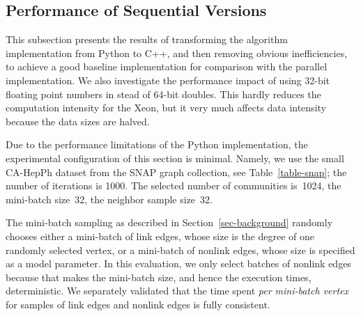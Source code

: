 \subsection{Performance of Sequential Versions}

This subsection presents the results of transforming the algorithm implementation
from Python to C++, and then removing obvious inefficiencies, to achieve a
good baseline implementation for comparison with the parallel implementation.
%
We also investigate the performance impact of using
32-bit floating point numbers in stead of 64-bit doubles.
This hardly reduces the computation intensity for the Xeon, but it very much
affects data intensity because the data sizes are halved.
%

Due to the performance limitations of the Python implementation, the
experimental configuration of this section is minimal.
%
Namely, we use the small CA-HepPh dataset from the SNAP graph collection, see
Table~\ref{table-snap}; the number of
iterations is 1000.
The selected number of communities is~1024, the mini-batch size~32, the
neighbor sample size~32.

The mini-batch sampling as described in Section~\ref{sec-background} randomly
chooses either a mini-batch of link edges, whose size is the degree of one
randomly selected vertex, or a mini-batch of nonlink edges, whose size is
specified as a model parameter. In this evaluation, we only select batches
of nonlink edges because that makes the mini-batch size, and hence the
execution times, deterministic. We separately validated that the time spent
\textit{per mini-batch vertex} for samples of link edges and nonlink edges
is fully consistent.


